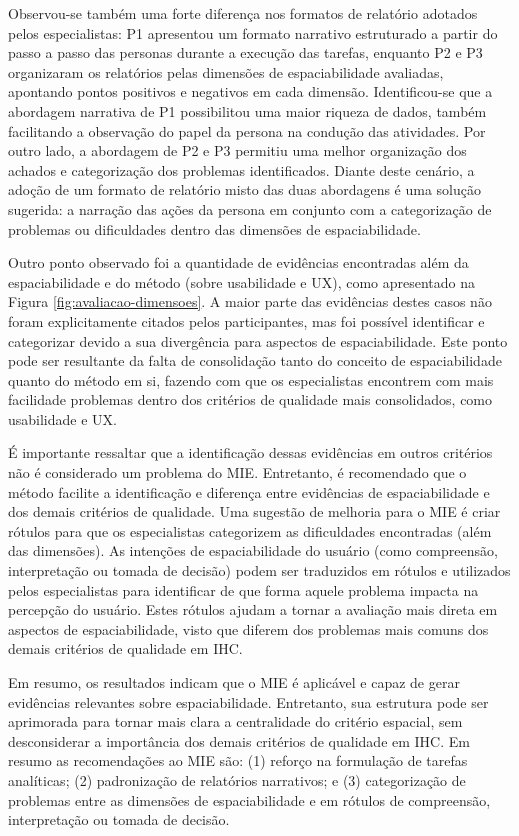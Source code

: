 \documentclass[12pt]{article}
\begin{document}
Observou-se também uma forte diferença nos formatos de relatório adotados pelos especialistas: P1 apresentou um formato narrativo estruturado a partir do passo a passo das personas durante a execução das tarefas, enquanto P2 e P3 organizaram os relatórios pelas dimensões de espaciabilidade avaliadas, apontando pontos positivos e negativos em cada dimensão. Identificou-se que a abordagem narrativa de P1 possibilitou uma maior riqueza de dados, também facilitando a observação do papel da persona na condução das atividades. Por outro lado, a abordagem de P2 e P3 permitiu uma melhor organização dos achados e categorização dos problemas identificados. Diante deste cenário, a adoção de um formato de relatório misto das duas abordagens é uma solução sugerida: a narração das ações da persona em conjunto com a categorização de problemas ou dificuldades dentro das dimensões de espaciabilidade. 

Outro ponto observado foi a quantidade de evidências encontradas além da espaciabilidade e do método (sobre usabilidade e UX), como apresentado na Figura \ref{fig:avaliacao-dimensoes}. A maior parte das evidências destes casos não foram explicitamente citados pelos participantes, mas foi possível identificar e categorizar devido a sua divergência para aspectos de espaciabilidade. Este ponto pode ser resultante da falta de consolidação tanto do conceito de espaciabilidade quanto do método em si, fazendo com que os especialistas encontrem com mais facilidade problemas dentro dos critérios de qualidade mais consolidados, como usabilidade e UX. 

É importante ressaltar que a identificação dessas evidências em outros critérios não é considerado um problema do MIE. Entretanto, é recomendado que o método facilite a identificação e diferença entre evidências de espaciabilidade e dos demais critérios de qualidade. Uma sugestão de melhoria para o MIE é criar rótulos para que os especialistas categorizem as dificuldades encontradas (além das dimensões). As intenções de espaciabilidade do usuário (como compreensão, interpretação ou tomada de decisão) podem ser traduzidos em rótulos e utilizados pelos especialistas para identificar de que forma aquele problema impacta na percepção do usuário. Estes rótulos ajudam a tornar a avaliação mais direta em aspectos de espaciabilidade, visto que diferem dos problemas mais comuns dos demais critérios de qualidade em IHC.

Em resumo, os resultados indicam que o MIE é aplicável e capaz de gerar evidências relevantes sobre espaciabilidade. Entretanto, sua estrutura pode ser aprimorada para tornar mais clara a centralidade do critério espacial, sem desconsiderar a importância dos demais critérios de qualidade em IHC. Em resumo as recomendações ao MIE são: (1) reforço na formulação de tarefas analíticas; (2) padronização de relatórios narrativos; e (3) categorização de problemas entre as dimensões de espaciabilidade e em rótulos de compreensão, interpretação ou tomada de decisão.
\end{document}
